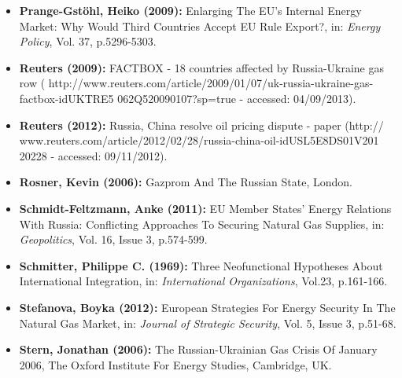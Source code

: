 \documentclass[11pt,a4paper,english]{scrreprt}
\begin{document}
\begin{itemize}
	\item [\Rectsteel] \textbf{Prange-Gst\"ohl, Heiko (2009):} Enlarging
The EU's Internal Energy Market: Why Would Third Countries Accept EU Rule
Export?, in: \textsl{Energy Policy}, Vol. 37, p.5296-5303.



\item [\Rectsteel] \textbf{Reuters (2009):} FACTBOX - 18 countries affected by
Russia-Ukraine gas row (\textcolor{dunkelgrau.80}{
http://www.reuters.com/article/2009/01/07/uk-russia-ukraine-gas-\\
factbox-idUKTRE5 062Q520090107?sp=true} - accessed: 04/09/2013).



\item [\Rectsteel] \textbf{Reuters (2012):} Russia, China resolve oil pricing
dispute - paper (\textcolor{dunkelgrau.80}{http://\\
www.reuters.com/article/2012/02/28/russia-china-oil-idUSL5E8DS01V201\\
20228} - accessed: 09/11/2012).



	\item [\Rectsteel] \textbf{Rosner, Kevin (2006):} Gazprom And The
Russian State, London.



	\item [\Rectsteel] \textbf{Schmidt-Feltzmann, Anke (2011):} EU Member
States' Energy Relations With Russia: Conflicting Approaches To Securing
Natural Gas Supplies, in: \textsl{Geopolitics}, Vol. 16, Issue 3, p.574-599.



	\item [\Rectsteel] \textbf{Schmitter, Philippe C. (1969):}
Three Neofunctional Hypotheses About International Integration, in:
\textsl{International Organizations}, Vol.23, p.161-166.



	\item [\Rectsteel] \textbf{Stefanova, Boyka (2012):} European
Strategies For Energy Security In The Natural Gas Market, in: \textsl{Journal
of Strategic Security}, Vol. 5, Issue 3, p.51-68.



	\item [\Rectsteel] \textbf{Stern, Jonathan (2006):} The
Russian-Ukrainian Gas Crisis Of January 2006, The Oxford Institute For Energy
Studies, Cambridge, UK.




\end{itemize}
\end{document}
